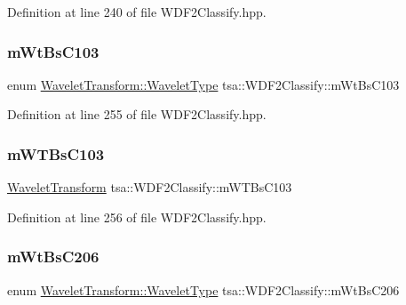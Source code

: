 Definition at line 240 of file W\+D\+F2\+Classify.\+hpp.

\mbox{\label{classtsa_1_1_w_d_f2_classify_ae58565c51462fa2453ae29550e9a1067}} 
\subsubsection{\texorpdfstring{m\+Wt\+Bs\+C103}{mWtBsC103}}
{\footnotesize\ttfamily enum \hyperlink{classtsa_1_1_wavelet_transform_a5a529de70e0004333fcf23b9cca88ce7}{Wavelet\+Transform\+::\+Wavelet\+Type} tsa\+::\+W\+D\+F2\+Classify\+::m\+Wt\+Bs\+C103\hspace{0.3cm}{\ttfamily [private]}}



Definition at line 255 of file W\+D\+F2\+Classify.\+hpp.

\mbox{\label{classtsa_1_1_w_d_f2_classify_a6727f3e9350844a3f58ecb547c5ee43e}} 
\subsubsection{\texorpdfstring{m\+W\+T\+Bs\+C103}{mWTBsC103}}
{\footnotesize\ttfamily \hyperlink{classtsa_1_1_wavelet_transform}{Wavelet\+Transform} tsa\+::\+W\+D\+F2\+Classify\+::m\+W\+T\+Bs\+C103\hspace{0.3cm}{\ttfamily [private]}}



Definition at line 256 of file W\+D\+F2\+Classify.\+hpp.

\mbox{\label{classtsa_1_1_w_d_f2_classify_a65eb9f16c9a193b616dbb61a14e2ffa3}} 
\subsubsection{\texorpdfstring{m\+Wt\+Bs\+C206}{mWtBsC206}}
{\footnotesize\ttfamily enum \hyperlink{classtsa_1_1_wavelet_transform_a5a529de70e0004333fcf23b9cca88ce7}{Wavelet\+Transform\+::\+Wavelet\+Type} tsa\+::\+W\+D\+F2\+Classify\+::m\+Wt\+Bs\+C206\hspace{0.3cm}{\ttfamily [private]}}



